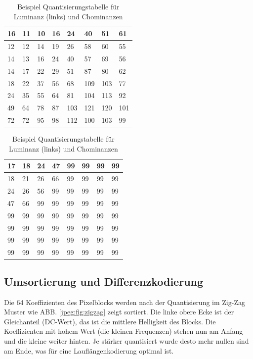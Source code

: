 \begin{table}
    \centering
    \begin{tabularx}{0.47\linewidth}{|X|X|X|X|X|X|X|X|}
        \hline
        16 & 11 & 10 & 16 & 24  & 40 & 51 & 61    \\ \hline
        12 & 12 & 14 & 19 & 26  & 58 & 60 & 55    \\ \hline
        14 & 13 & 16 & 24 & 40  & 57 & 69 & 56    \\ \hline
        14 & 17 & 22 & 29 & 51  & 87 & 80 & 62    \\ \hline
        18 & 22 & 37 & 56 & 68  & 109 & 103 & 77  \\ \hline
        24 & 35 & 55 & 64 & 81  & 104 & 113 & 92  \\ \hline
        49 & 64 & 78 & 87 & 103 & 121 & 120 & 101 \\ \hline
        72 & 72 & 95 & 98 & 112 & 100 & 103 & 99  \\ \hline        
    \end{tabularx}
    \qquad
    \begin{tabularx}{0.47\linewidth}{|X|X|X|X|X|X|X|X|}
        \hline
        17 & 18 & 24 & 47 & 99 & 99 & 99 & 99  \\ \hline
        18 & 21 & 26 & 66 & 99 & 99 & 99 & 99  \\ \hline
        24 & 26 & 56 & 99 & 99 & 99 & 99 & 99  \\ \hline
        47 & 66 & 99 & 99 & 99 & 99 & 99 & 99  \\ \hline
        99 & 99 & 99 & 99 & 99 & 99 & 99 & 99  \\ \hline
        99 & 99 & 99 & 99 & 99 & 99 & 99 & 99  \\ \hline
        99 & 99 & 99 & 99 & 99 & 99 & 99 & 99  \\ \hline
        99 & 99 & 99 & 99 & 99 & 99 & 99 & 99  \\ \hline  	  
    \end{tabularx}
    \caption{Beispiel Quantisierungstabelle für Luminanz (links) und Chominanzen
        \label{jpeg:tab:quant}}
\end{table}

\subsection{Umsortierung und Differenzkodierung
\label{jpeg:subsection:umsortierung}}
Die 64 Koeffizienten des Pixelblocks werden nach der Quantisierung im Zig-Zag Muster wie ABB. \ref{jpeg:fig:zigzag} zeigt sortiert.
Die linke obere Ecke ist der Gleichanteil (DC-Wert), das ist die mittlere Helligkeit des Blocks.
Die Koeffizienten mit hohem Wert (die kleinen Frequenzen) stehen nun am Anfang und die kleine weiter hinten.
Je stärker quantisiert wurde desto mehr nullen sind am Ende, was für eine Lauflängenkodierung optimal ist.

